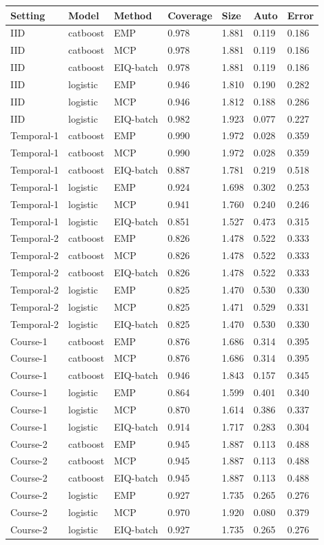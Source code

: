 \begin{tabular}{lllllll}
\toprule
Setting & Model & Method & Coverage & Size & Auto & Error\\
\midrule
IID & catboost & EMP & 0.978 & 1.881 & 0.119 & 0.186\\
IID & catboost & MCP & 0.978 & 1.881 & 0.119 & 0.186\\
IID & catboost & EIQ-batch & 0.978 & 1.881 & 0.119 & 0.186\\
IID & logistic & EMP & 0.946 & 1.810 & 0.190 & 0.282\\
IID & logistic & MCP & 0.946 & 1.812 & 0.188 & 0.286\\
IID & logistic & EIQ-batch & 0.982 & 1.923 & 0.077 & 0.227\\
Temporal-1 & catboost & EMP & 0.990 & 1.972 & 0.028 & 0.359\\
Temporal-1 & catboost & MCP & 0.990 & 1.972 & 0.028 & 0.359\\
Temporal-1 & catboost & EIQ-batch & 0.887 & 1.781 & 0.219 & 0.518\\
Temporal-1 & logistic & EMP & 0.924 & 1.698 & 0.302 & 0.253\\
Temporal-1 & logistic & MCP & 0.941 & 1.760 & 0.240 & 0.246\\
Temporal-1 & logistic & EIQ-batch & 0.851 & 1.527 & 0.473 & 0.315\\
Temporal-2 & catboost & EMP & 0.826 & 1.478 & 0.522 & 0.333\\
Temporal-2 & catboost & MCP & 0.826 & 1.478 & 0.522 & 0.333\\
Temporal-2 & catboost & EIQ-batch & 0.826 & 1.478 & 0.522 & 0.333\\
Temporal-2 & logistic & EMP & 0.825 & 1.470 & 0.530 & 0.330\\
Temporal-2 & logistic & MCP & 0.825 & 1.471 & 0.529 & 0.331\\
Temporal-2 & logistic & EIQ-batch & 0.825 & 1.470 & 0.530 & 0.330\\
Course-1 & catboost & EMP & 0.876 & 1.686 & 0.314 & 0.395\\
Course-1 & catboost & MCP & 0.876 & 1.686 & 0.314 & 0.395\\
Course-1 & catboost & EIQ-batch & 0.946 & 1.843 & 0.157 & 0.345\\
Course-1 & logistic & EMP & 0.864 & 1.599 & 0.401 & 0.340\\
Course-1 & logistic & MCP & 0.870 & 1.614 & 0.386 & 0.337\\
Course-1 & logistic & EIQ-batch & 0.914 & 1.717 & 0.283 & 0.304\\
Course-2 & catboost & EMP & 0.945 & 1.887 & 0.113 & 0.488\\
Course-2 & catboost & MCP & 0.945 & 1.887 & 0.113 & 0.488\\
Course-2 & catboost & EIQ-batch & 0.945 & 1.887 & 0.113 & 0.488\\
Course-2 & logistic & EMP & 0.927 & 1.735 & 0.265 & 0.276\\
Course-2 & logistic & MCP & 0.970 & 1.920 & 0.080 & 0.379\\
Course-2 & logistic & EIQ-batch & 0.927 & 1.735 & 0.265 & 0.276\\
\bottomrule
\end{tabular}